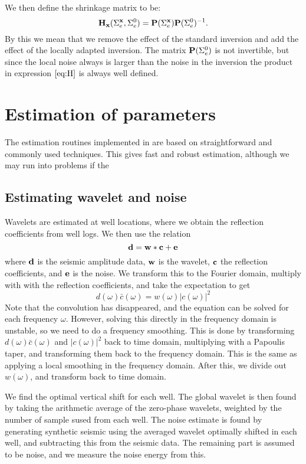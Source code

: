 We then define the shrinkage matrix to be:
\begin{equation}\label{eq:H}
\mathbf{H_x}(\Sigma_{e}^{\mathbf{x}},\Sigma_{e}^0) = \mathbf{P}(\Sigma_{e}^{\mathbf{x}})\mathbf{P}(\Sigma_{e}^0)^{-1}.
\end{equation}
By this we mean that we remove the effect of the standard inversion and add the effect of
the locally adapted inversion. The matrix $\mathbf{P}(\Sigma_{e}^0)$ is not invertible,
but since the local noise always is larger than the noise in the inversion the product in
expression $\ref{eq:H}$ is always well defined.


\section{Estimation of parameters}
\label{sec:estimateimp}
The estimation routines implemented in \crava are based on straightforward and commonly used techniques. This gives fast and robust estimation, although we may run into problems if the
\subsection{Estimating wavelet and noise}
\label{sec:waveestimp}
Wavelets are estimated at well locations, where we obtain the reflection coefficients from well logs. We then use the relation
\begin{equation}
\mathbf{d} = \mathbf{w}*\mathbf{c}+\mathbf{e}
\end{equation}
where $\mathbf{d}$ is the seismic amplitude data, $\mathbf{w}$ is the wavelet, $\mathbf{c}$ the reflection coefficients, and $\mathbf{e}$ is the noise. We transform this to the Fourier domain, multiply with with the reflection coefficients, and take the expectation to get
\begin{equation}
d(\omega)\bar{c}(\omega) = w(\omega)|c(\omega)|^2
\end{equation}
Note that the convolution has disappeared, and the equation can be solved for each frequency $\omega$. However, solving this directly in the frequency domain is unstable, so we need to do a frequency smoothing. This is done by transforming $d(\omega)\bar{c}(\omega)$ and $|c(\omega)|^2$ back to time domain, multiplying with a Papoulis taper, and transforming them back to the frequency domain. This is the same as applying a local smoothing in the frequency domain. After this, we divide out $w(\omega)$, and transform back to time domain.

We find the optimal vertical shift for each well. The global wavelet is then found by taking the arithmetic average of the zero-phase wavelets, weighted by the number of sample sused from each well. The noise estimate is found by generating synthetic seismic using the averaged wavelet optimally shifted in each well, and subtracting this from the seismic data. The remaining part is assumed to be noise, and we measure the noise energy from this.

